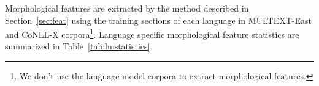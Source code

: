 Morphological features are extracted by the method described in
Section~\ref{sec:feat} using the training sections of each language in
MULTEXT-East and CoNLL-X corpora\footnote{We don't use the language
  model corpora to extract morphological features.}.  Language
specific morphological feature statistics are summarized in
Table~\ref{tab:lmstatistics}.

